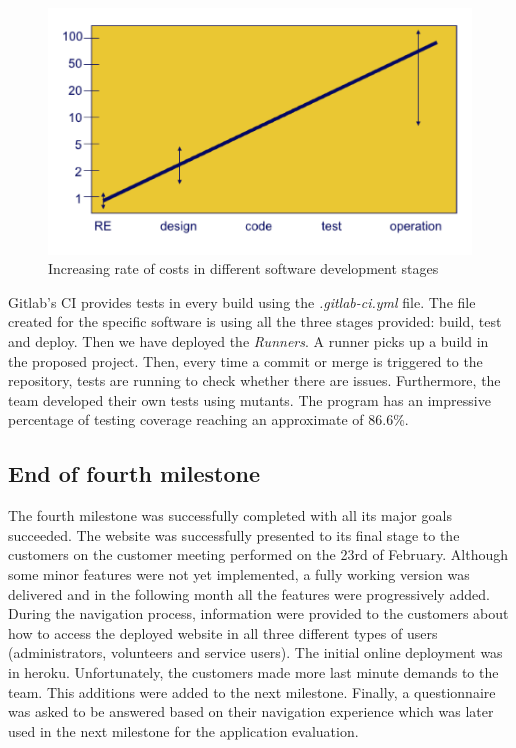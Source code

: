\documentclass{l3proj}
\begin{document}
\begin{figure}[h]
\centerline{\includegraphics[width=\textwidth, height=\textheight, keepaspectratio]{costOfErrors.png}}
\caption{Increasing rate of costs in different software development stages }
\label{fig:errors}
\end{figure}

Gitlab's CI provides tests in every build using the \textit{.gitlab-ci.yml} file. The file created for the specific software is using all the three stages provided: build, test and deploy. Then we have deployed the \textit{Runners}. A runner picks up a build in the proposed project. Then, every time a commit or merge is triggered to the repository, tests are running to check whether there are issues. Furthermore, the team developed their own tests using mutants. The program has an impressive percentage of testing coverage reaching an approximate of 86.6\%.


\subsection{End of fourth milestone}
\label{sec:milestone4}

The fourth milestone was successfully completed with all its major goals succeeded. The website was successfully presented to its final stage to the customers on the customer meeting performed on the 23rd of February. Although some minor features were not yet implemented, a fully working version was delivered and in the following month all the features were progressively added. During the navigation process, information were provided to the customers about how to access the deployed website in all three different types of users (administrators, volunteers and service users). The initial online deployment was in heroku. Unfortunately, the customers made more last minute demands to the team. This additions were added to the next milestone. Finally, a questionnaire was asked to be answered based on their navigation experience which was later used in the next milestone for the application evaluation. 
\end{document}

